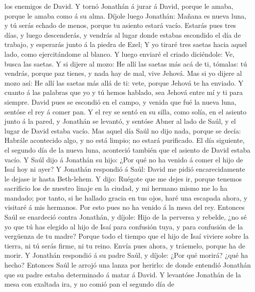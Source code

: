 los enemigos de David.  Y tornó Jonathán á jurar á David,
porque le amaba, porque le amaba como á su alma.  Díjole
luego Jonathán: Mañana es nueva luna, y tú serás echado de menos, porque
tu asiento estará vacío.  Estarás pues tres días, y luego
descenderás, y vendrás al lugar donde estabas escondido el día de
trabajo, y esperarás junto á la piedra de Ezel;  Y yo
tiraré tres saetas hacia aquel lado, como ejercitándome al blanco.
 Y luego enviaré el criado diciéndole: Ve, busca las
saetas. Y si dijere al mozo: He allí las saetas más acá de ti, tómalas:
tú vendrás, porque paz tienes, y nada hay de mal, vive Jehová.
 Mas si yo dijere al mozo así: He allí las saetas más
allá de ti: vete, porque Jehová te ha enviado.  Y cuanto
á las palabras que yo y tú hemos hablado, sea Jehová entre mí y ti para
siempre.  David pues se escondió en el campo, y venida
que fué la nueva luna, sentóse el rey á comer pan.  Y el
rey se sentó en su silla, como solía, en el asiento junto á la pared, y
Jonathán se levantó, y sentóse Abner al lado de Saúl, y el lugar de
David estaba vacío.  Mas aquel día Saúl no dijo nada,
porque se decía: Habrále acontecido algo, y no está limpio; no estará
purificado.  El día siguiente, el segundo día de la nueva
luna, aconteció también que el asiento de David estaba vacío. Y Saúl
dijo á Jonathán su hijo: ¿Por qué no ha venido á comer el hijo de Isaí
hoy ni ayer?  Y Jonathán respondió á Saúl: David me pidió
encarecidamente le dejase ir hasta Beth-lehem.  Y dijo:
Ruégote que me dejes ir, porque tenemos sacrificio los de nuestro linaje
en la ciudad, y mi hermano mismo me lo ha mandado; por tanto, si he
hallado gracia en tus ojos, haré una escapada ahora, y visitaré á mis
hermanos. Por esto pues no ha venido á la mesa del rey. 
Entonces Saúl se enardeció contra Jonathán, y díjole: Hijo de la
perversa y rebelde, ¿no sé yo que tú has elegido al hijo de Isaí para
confusión tuya, y para confusión de la vergüenza de tu madre?
 Porque todo el tiempo que el hijo de Isaí viviere sobre
la tierra, ni tú serás firme, ni tu reino. Envía pues ahora, y tráemelo,
porque ha de morir.  Y Jonathán respondió á su padre
Saúl, y díjole: ¿Por qué morirá? ¿qué ha hecho?  Entonces
Saúl le arrojó una lanza por herirlo: de donde entendió Jonathán que su
padre estaba determinado á matar á David.  Y levantóse
Jonathán de la mesa con exaltada ira, y no comió pan el segundo día de
